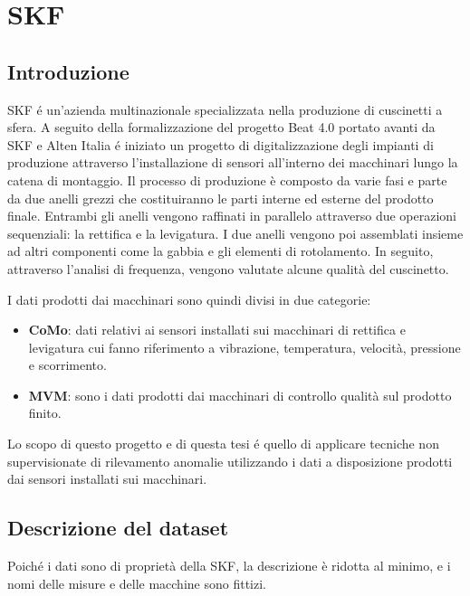 \chapter{SKF}
\label{chap:skf}

\section{Introduzione}
SKF é un'azienda multinazionale specializzata nella produzione di cuscinetti a sfera. A seguito della formalizzazione del progetto Beat 4.0 portato avanti da SKF e Alten Italia é iniziato un progetto di digitalizzazione degli impianti di produzione attraverso l'installazione di sensori all'interno dei macchinari lungo la catena di montaggio.
Il processo di produzione è composto da varie fasi e parte da due anelli grezzi che costituiranno le parti interne ed esterne del prodotto finale. Entrambi gli anelli vengono raffinati
in parallelo attraverso due operazioni sequenziali: la rettifica e la levigatura. 
I due anelli vengono poi assemblati insieme ad altri componenti come la gabbia e gli elementi di rotolamento. In seguito, attraverso l'analisi di frequenza, vengono valutate alcune qualità del cuscinetto.

I dati prodotti dai macchinari sono quindi divisi in due categorie: 
\begin{itemize}
	\item \textbf{CoMo}: dati relativi ai sensori installati sui macchinari di rettifica e levigatura cui fanno riferimento a vibrazione, temperatura, velocità, pressione e scorrimento.
	\item \textbf{MVM}: sono i dati prodotti dai macchinari di controllo qualità sul prodotto finito.
\end{itemize}

Lo scopo di questo progetto e di questa tesi é quello di applicare tecniche non supervisionate di rilevamento anomalie utilizzando i dati a disposizione prodotti dai sensori installati sui macchinari.

\section{Descrizione del dataset}
Poiché i dati sono di proprietà della SKF, la descrizione è ridotta al minimo, e i nomi delle misure e delle macchine sono fittizi.


